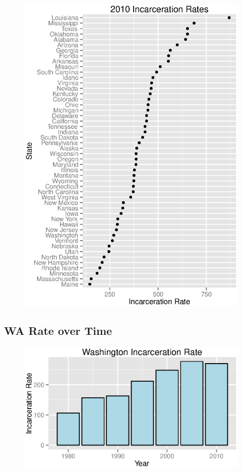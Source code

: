 \documentclass{exam}
\begin{document}
  \begin{figure}[H]
    \centering
    \includegraphics[scale = 0.9]{rates_2010.eps}
  \end{figure}

  \subsection{WA Rate over Time}
  \begin{figure}[H]
    \centering
    \includegraphics[scale = 0.9]{wa_rate.eps}
  \end{figure}
\end{document}
